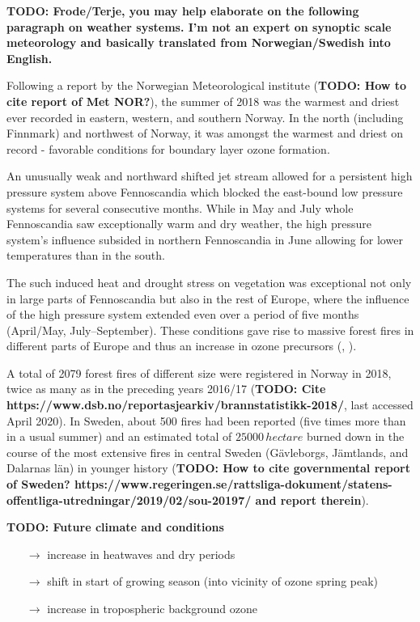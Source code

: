 \documentclass[bg, manuscript]{copernicus}
\begin{document}
{\bf TODO: Frode/Terje, you may help elaborate on the following paragraph on weather systems. I'm not an expert on synoptic scale meteorology and basically translated from Norwegian/Swedish into English.}

Following a report by the Norwegian Meteorological institute ({\bf TODO: How to cite report of Met NOR?}), the summer of 2018 was the warmest and driest ever recorded in eastern, western, and southern Norway. In the north (including Finnmark) and northwest of Norway, it was amongst the warmest and driest on record - favorable conditions for boundary layer ozone formation.

An unusually weak and northward shifted jet stream allowed for a persistent high pressure system above Fennoscandia which blocked the east-bound low pressure systems for several consecutive months. While in May and July whole Fennoscandia saw exceptionally warm and dry weather, the high pressure system's influence subsided in northern Fennoscandia in June allowing for lower temperatures than in the south. 

The such induced heat and drought stress on vegetation was exceptional not only in large parts of Fennoscandia but also in the rest of Europe, where the influence of the high pressure system extended even over a period of five months (April/May, July--September). These conditions gave rise to massive forest fires in different parts of Europe and thus an increase in ozone precursors (, ).

A total of 2079 forest fires of different size were registered in Norway in 2018, twice as many as in the preceding years 2016/17 ({\bf TODO: Cite https://www.dsb.no/reportasjearkiv/brannstatistikk-2018/}, last accessed April 2020). In Sweden, about 500 fires had been reported (five times more than in a usual summer) and an estimated total of $25000\,\unit{hectare}$ burned down in the course of the most extensive fires in central Sweden (G\"{a}vleborgs, J\"{a}mtlands, and Dalarnas l\"{a}n) in younger history ({\bf TODO: How to cite governmental report of Sweden? https://www.regeringen.se/rattsliga-dokument/statens-offentliga-utredningar/2019/02/sou-20197/ and report therein}).\\

{\bf TODO: Future climate and conditions
  \begin{itemize}
  \item[$\rightarrow$] increase in heatwaves and dry periods
  \item[$\rightarrow$] shift in start of growing season (into vicinity of ozone spring peak)
  \item[$\rightarrow$] increase in tropospheric background ozone
  \end{itemize}
}
\end{document}
